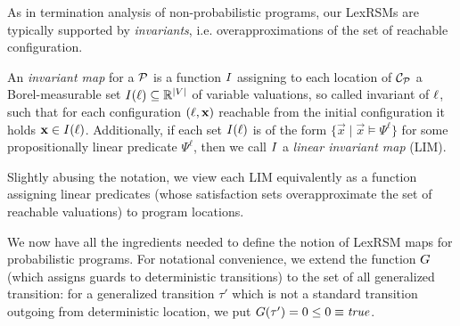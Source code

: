 
As in termination analysis of non-probabilistic programs, our LexRSMs are typically supported by \emph{invariants}, i.e. overapproximations of the set of reachable configuration. 

\begin{definition}
An \emph{invariant map} for a \PP{} $\mathcal{P}$ is a function $I$ assigning to each location of $\mathcal{C}_{\mathcal{P}}$ a Borel-measurable set $I({\ell})\subseteq \mathbb{R}^{|V|}$ of variable valuations, so called invariant of $\ell$, such that for each configuration $(\ell,\mathbf{x})$ reachable from the initial configuration it holds $\mathbf{x}\in I(\ell)$. Additionally, if each set $I(\ell)$ is of the form $\{\vec{x}\mid\vec{x}\models \Psi^\ell \}$ for some propositionally linear predicate $\Psi^\ell$, then we call $I$ a \emph{linear invariant map} (LIM).
\end{definition}

Slightly abusing the notation, we view each LIM equivalently as a function assigning linear predicates (whose satisfaction sets overapproximate the set of reachable valuations) to program locations.

We now have all the ingredients needed to define the notion of LexRSM maps for probabilistic programs. For notational convenience, we extend the function $G$ (which assigns guards to deterministic transitions) to the set of all generalized transition: for a generalized transition $\tau'$ which is not a standard transition outgoing from deterministic location, we put $G(\tau')=0\leq 0 \equiv \mathit{true}$.

